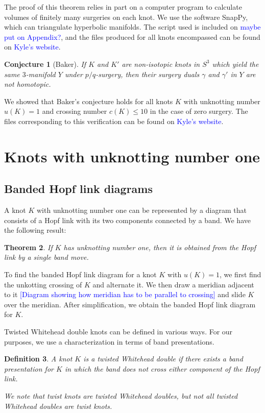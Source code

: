 \documentclass[11pt,usenames,dvipsnames,reqno]{amsart}
\newtheorem{theorem}{Theorem}
\numberwithin{theorem}{section}
\newtheorem{conjecture}[theorem]{Conjecture}
\theoremstyle{ex}
\newtheorem{definition}[theorem]{Definition}
\theoremstyle{rem}
\def\kh#1{\textcolor{Blue}{#1}}
\begin{document}
The proof of this theorem relies in part on a computer program to calculate volumes of finitely many surgeries on each knot. We use the software SnapPy, which can triangulate hyperbolic manifolds. The script used is included on \kh{maybe put on Appendix?}, and the files produced for all knots encompassed can be found on \kh{Kyle's website}.

\begin{conjecture}[Baker] If $K$ and $K'$ are non-isotopic knots in $S^3$ which yield the same $3$-manifold $Y$ under $p/q$-surgery, then their surgery duals $\gamma$ and $\gamma'$ in $Y$ are not homotopic.
\end{conjecture}

We showed that Baker's conjecture holds for all knots $K$ with unknotting number $u(K) = 1$ and crossing number $c(K) \leq 10$ in the case of zero surgery. The files corresponding to this verification can be found on \kh{Kyle's website}.


\section{Knots with unknotting number one}\label{sec:unknotting-one}


\subsection{Banded Hopf link diagrams}\label{band} A knot $K$ with unknotting number one can be represented by a diagram that consists of a Hopf link with its two components connected by a band. We have the following result:

\begin {theorem} If $K$ has unknotting number one, then it is obtained from the Hopf link by a single band move.
\end{theorem}

To find the banded Hopf link diagram for a knot $K$ with $u(K) =1$, we first find the unkotting crossing of $K$ and alternate it. We then draw a meridian adjacent to it \kh{[Diagram showing how meridian has to be parallel to crossing]} and slide $K$ over the meridian. After simplification, we obtain the banded Hopf link diagram for $K$. 

Twisted Whitehead double knots can be defined in various ways. For our purposes, we use a characterization in terms of band presentations.

\begin{definition} A knot $K$ is a \textit{twisted Whitehead double} if there exists a band presentation for $K$ in which the band does not cross either component of the Hopf link.
	
We note that twist knots are twisted Whitehead doubles, but not all twisted Whitehead doubles are twist knots.

\end{definition}
\end{document}
